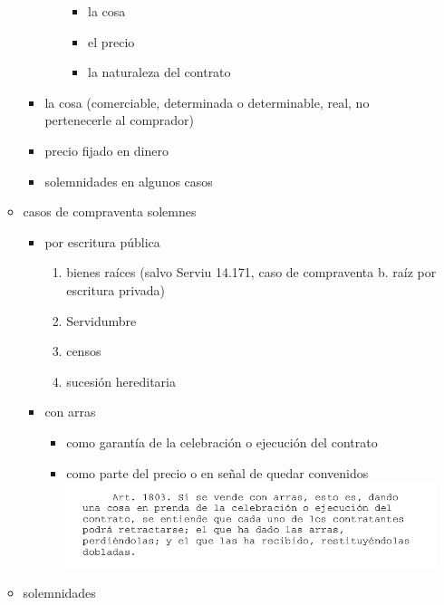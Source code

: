 \documentclass[]{article}
\providecommand{\tightlist}{%
  \setlength{\itemsep}{0pt}\setlength{\parskip}{0pt}}
\begin{document}
\begin{itemize}
\begin{itemize}
\begin{itemize}
\begin{itemize}
        \begin{itemize}
        \tightlist
        \item
          la cosa
        \item
          el precio
        \item
          la naturaleza del contrato
        \end{itemize}
      \end{itemize}
    \item
      la cosa (comerciable, determinada o determinable, real, no
      pertenecerle al comprador)
    \item
      precio fijado en dinero
    \item
      solemnidades en algunos casos
    \end{itemize}
  \item
    casos de compraventa solemnes

    \begin{itemize}
    \tightlist
    \item
      por escritura pública

      \begin{enumerate}
      \def\labelenumi{\arabic{enumi}.}
      \tightlist
      \item
        bienes raíces (salvo Serviu 14.171, caso de compraventa b. raíz
        por escritura privada)
      \item
        Servidumbre
      \item
        censos
      \item
        sucesión hereditaria
      \end{enumerate}
    \item
      con arras

      \begin{itemize}
      \tightlist
      \item
        como garantía de la celebración o ejecución del contrato
      \item
        como parte del precio o en señal de quedar convenidos
        \includegraphics{arras.png}
      \end{itemize}
    \end{itemize}
  \item
    solemnidades


\end{itemize}
\end{itemize}
\end{document}
